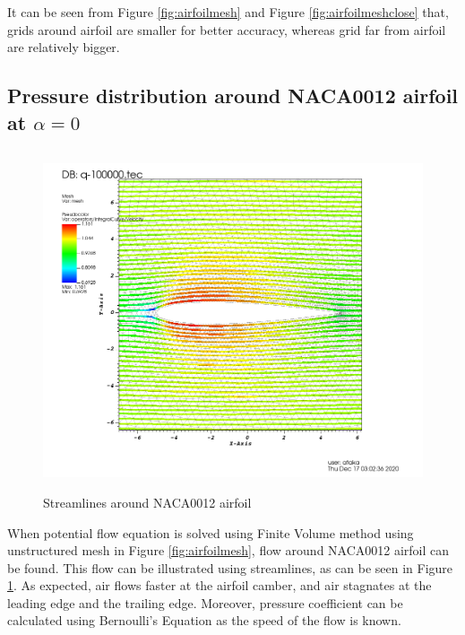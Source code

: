 \documentclass[letterpaper,12pt]{article}
\begin{document}
\vspace{2cm}

It can be seen from Figure \ref{fig:airfoilmesh} and Figure \ref{fig:airfoilmeshclose} that, grids around 
airfoil are smaller for better accuracy, whereas grid far from airfoil are relatively bigger.
\newpage

\subsection{Pressure distribution around NACA0012 airfoil at $\alpha = 0$}

\begin{figure} [!h]
	\centering
	\includegraphics[height = 10cm]{graph/medium/medium_streamline0000.png}
	\caption{Streamlines around NACA0012 airfoil}
    \label{fig:airfoilstreamline}
\end{figure}

When potential flow equation is solved using Finite Volume method using unstructured mesh in Figure \ref{fig:airfoilmesh},
flow around NACA0012 airfoil can be found. This flow can be illustrated using streamlines, as can be seen in 
Figure \ref{fig:airfoilstreamline}. As expected, air flows faster at the airfoil camber, and air stagnates at the 
leading edge and the trailing edge. Moreover, pressure coefficient can be calculated using Bernoulli's Equation 
as the speed of the flow is known.

\newpage
\end{document}
